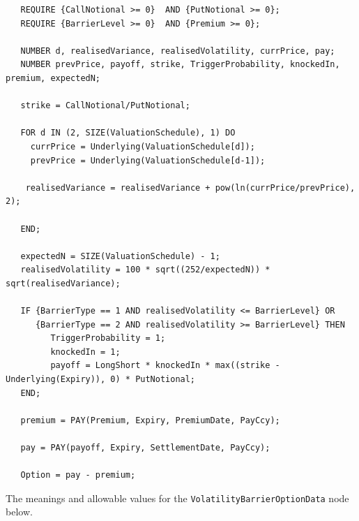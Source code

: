 \begin{listing}[hbt]
\begin{verbatim}
   REQUIRE {CallNotional >= 0}  AND {PutNotional >= 0};
   REQUIRE {BarrierLevel >= 0}  AND {Premium >= 0};

   NUMBER d, realisedVariance, realisedVolatility, currPrice, pay;
   NUMBER prevPrice, payoff, strike, TriggerProbability, knockedIn, premium, expectedN;

   strike = CallNotional/PutNotional;

   FOR d IN (2, SIZE(ValuationSchedule), 1) DO
     currPrice = Underlying(ValuationSchedule[d]);
     prevPrice = Underlying(ValuationSchedule[d-1]);

    realisedVariance = realisedVariance + pow(ln(currPrice/prevPrice), 2);

   END;

   expectedN = SIZE(ValuationSchedule) - 1;
   realisedVolatility = 100 * sqrt((252/expectedN)) * sqrt(realisedVariance);

   IF {BarrierType == 1 AND realisedVolatility <= BarrierLevel} OR
      {BarrierType == 2 AND realisedVolatility >= BarrierLevel} THEN
         TriggerProbability = 1;
         knockedIn = 1;
         payoff = LongShort * knockedIn * max((strike - Underlying(Expiry)), 0) * PutNotional;
   END;

   premium = PAY(Premium, Expiry, PremiumDate, PayCcy);

   pay = PAY(payoff, Expiry, SettlementDate, PayCcy);

   Option = pay - premium;
\end{verbatim}
\caption{Payoff script for a VolatilityBarrierOption.}
\label{lst:fxvol_barrier_option}
\end{listing}

The meanings and allowable values for the \lstinline!VolatilityBarrierOptionData! node below.

